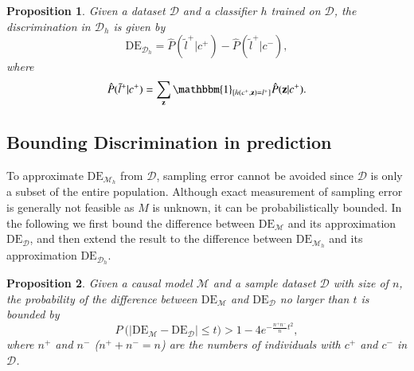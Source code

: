 \documentclass{article}
\newtheorem{proposition}{Proposition}
\begin{document}
\begin{proposition}
Given a dataset $\mathcal{D}$ and a classifier $h$ trained on $\mathcal{D}$, the discrimination in $\mathcal{D}_{h}$ is given by
\begin{equation*}
\mathrm{DE}_{\mathcal{D}_{h}} = \hat{P}(\tilde{l}^{+}|c^{+}) - \hat{P}(\tilde{l}^{+}|c^{-}),
\end{equation*}
where
\begin{equation}\label{eq:plc_}
\hat{P}(\tilde{l}^{+}|c^{+}) = \sum_{\mathbf{z}}\mathbbm{1}_{[h(c^{+},\mathbf{z})=l^{+}]}\hat{P}(\mathbf{z}|c^{+}). %
\end{equation}
\end{proposition}

\subsection{Bounding Discrimination in prediction}
To approximate $\mathrm{DE}_{\mathcal{M}_{h}}$ from $\mathcal{D}$, sampling error cannot be avoided since $\mathcal{D}$ is only a subset of the entire population. Although exact measurement of sampling error is generally not feasible as $M$ is unknown, it can be probabilistically bounded. In the following we first bound the difference between $\mathrm{DE}_{\mathcal{M}}$ and its approximation $\mathrm{DE}_{\mathcal{D}}$, and then extend the result to the difference between $\mathrm{DE}_{\mathcal{M}_{h}}$ and its approximation $\mathrm{DE}_{\mathcal{D}_{h}}$.



\begin{proposition}\label{thm:md}
Given a causal model $\mathcal{M}$ and a sample dataset $\mathcal{D}$ with size of $n$, the probability of the difference between $\mathrm{DE}_{\mathcal{M}}$ and $\mathrm{DE}_{\mathcal{D}}$ no larger than $t$ is bounded by
\begin{equation*}
P~ \bigg( \left| \mathrm{DE}_{\mathcal{M}} - \mathrm{DE}_{\mathcal{D}} \right| \leq t \bigg) > 1-4e^{-\frac{n^{+}n^{-}}{n}t^{2}},
\end{equation*}
where $n^{+}$ and $n^{-}$ ($n^{+}+n^{-}=n$) are the numbers of individuals with $c^{+}$ and $c^{-}$ in $\mathcal{D}$.
\end{proposition}
\end{document}
